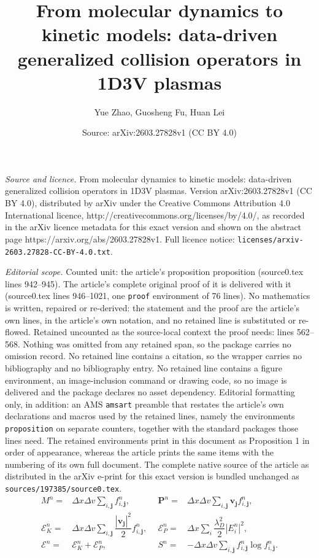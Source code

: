 \documentclass[10pt,a4paper]{amsart}
\title{From molecular dynamics to kinetic models: data-driven generalized collision operators in 1D3V plasmas}
\author{Yue Zhao, Guosheng Fu, Huan Lei}
\date{Source: arXiv:2603.27828v1 (CC BY 4.0)}
\begin{document}
\maketitle

\noindent\emph{Source and licence.} From molecular dynamics to kinetic models: data-driven generalized collision operators in 1D3V plasmas. Version arXiv:2603.27828v1 (CC BY 4.0), distributed by arXiv under the Creative Commons Attribution 4.0 International licence, http://creativecommons.org/licenses/by/4.0/, as recorded in the arXiv licence metadata for this exact version and shown on the abstract page https://arxiv.org/abs/2603.27828v1. Full licence notice: \texttt{licenses/arxiv-2603.27828-CC-BY-4.0.txt}.\par\smallskip

\noindent\textit{Editorial scope.} Counted unit: the article's proposition proposition (source0.tex lines 942--945). The article's complete original proof of it is delivered with it (source0.tex lines 946--1021, one \texttt{proof} environment of 76 lines). No mathematics is written, repaired or re-derived: the statement and the proof are the article's own lines, in the article's own notation, and no retained line is substituted or re-flowed.  Retained uncounted as the source-local context the proof needs: lines 562--568.  Nothing was omitted from any retained span, so the package carries no omission record.  No retained line contains a citation, so the wrapper carries no bibliography and no bibliography entry.  No retained line contains a figure environment, an image-inclusion command or drawing code, so no image is delivered and the package declares no asset dependency.  Editorial formatting only, in addition: an AMS \texttt{amsart} preamble that restates the article's own declarations and macros used by the retained lines, namely the environments \texttt{proposition} on separate counters, together with the standard packages those lines need.  The retained environments print in this document as Proposition 1 in order of appearance, whereas the article prints the same items with the numbering of its own full document.  The complete native source of the article as distributed in the arXiv e-print for this exact version is bundled unchanged as \texttt{sources/197385/source0.tex}.
\begin{equation}\label{eq:MPE}
    \begin{aligned}
        M^{n} =& \Delta x \Delta v \sum_{i,\bm{j}} f_{i,\bm{j}}^{n}, ~~ &\bm{P}^{n} =& \Delta x \Delta v \sum_{i,\bm{j}} \bm{v}_{\bm{j}} f_{i,\bm{j}}^{n}, \\
        \mathcal{E}_{K}^{n} =& \Delta x \Delta v \sum_{i,\bm{j}} \dfrac{|\bm{v}_{\bm{j}}|^{2}}{2} f_{i,\bm{j}}^{n}, ~~ &\mathcal{E}_{P}^{n} =& \Delta x \sum_{i} \dfrac{\lambda_{D}^{2}}{2} |E_{i}^{n}|^{2} , \\
        \mathcal{E}^{n} =& \mathcal{E}_{K}^{n} + \mathcal{E}_{P}^{n}, ~~ &S^{n} =& - \Delta x \Delta v \sum_{i,\bm{j}} f_{i,\bm{j}}^{n} \log f_{i,\bm{j}}^{n} .
    \end{aligned}
\end{equation}
\end{document}
